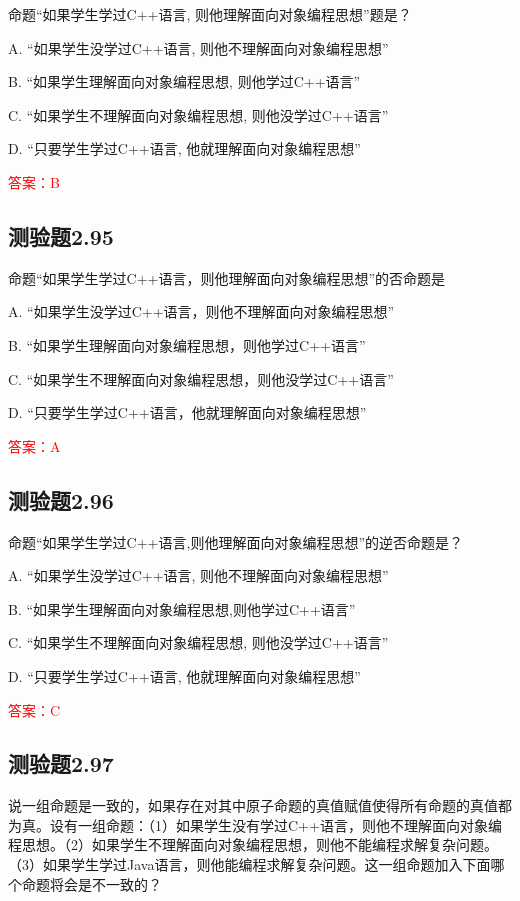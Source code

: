 \documentclass[UTF8, heading=true]{ctexart}
\begin{document}
命题“如果学生学过C++语言, 则他理解面向对象编程思想”题是？

A. “如果学生没学过C++语言, 则他不理解面向对象编程思想”

B. “如果学生理解面向对象编程思想, 则他学过C++语言”

C. “如果学生不理解面向对象编程思想, 则他没学过C++语言”

D. “只要学生学过C++语言, 他就理解面向对象编程思想”

\textcolor{red}{答案：B}

\subsection{测验题2.95}

命题“如果学生学过C++语言，则他理解面向对象编程思想”的否命题是

A. 
“如果学生没学过C++语言，则他不理解面向对象编程思想”

B. 
“如果学生理解面向对象编程思想，则他学过C++语言”

C. 
“如果学生不理解面向对象编程思想，则他没学过C++语言”

D. 
“只要学生学过C++语言，他就理解面向对象编程思想”

\textcolor{red}{答案：A}

\subsection{测验题2.96}

命题“如果学生学过C++语言,则他理解面向对象编程思想”的逆否命题是？

A. “如果学生没学过C++语言, 则他不理解面向对象编程思想”

B. “如果学生理解面向对象编程思想,则他学过C++语言”

C. “如果学生不理解面向对象编程思想, 则他没学过C++语言”

D. “只要学生学过C++语言, 他就理解面向对象编程思想”

\textcolor{red}{答案：C}

\subsection{测验题2.97}

说一组命题是一致的，如果存在对其中原子命题的真值赋值使得所有命题的真值都为真。设有一组命题：（1）如果学生没有学过C++语言，则他不理解面向对象编程思想。（2）如果学生不理解面向对象编程思想，则他不能编程求解复杂问题。（3）如果学生学过Java语言，则他能编程求解复杂问题。这一组命题加入下面哪个命题将会是不一致的？
\end{document}
